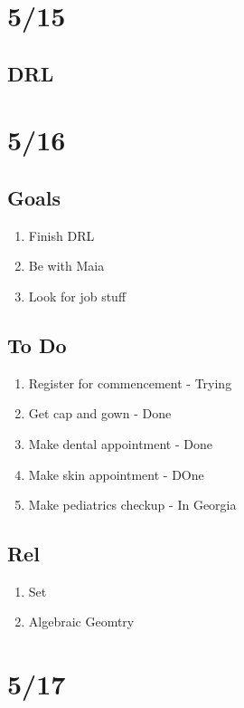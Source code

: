\documentclass[11pt]{article}
\theoremstyle{remark}
\begin{document}
\section{5/15}

\subsection{DRL}

\section{5/16}

\subsection{Goals}

\begin{enumerate}
	\item Finish DRL
	\item Be with Maia
	\item Look for job stuff
\end{enumerate}

\subsection{To Do}

\begin{enumerate}
	\item Register for commencement - Trying
	\item Get cap and gown - Done
	\item Make dental appointment - Done
	\item Make skin appointment - DOne
	\item Make pediatrics checkup - In Georgia
\end{enumerate}

\subsection{Rel}

\begin{enumerate}
	\item Set
	\item Algebraic Geomtry
\end{enumerate}

\section{5/17}
\end{document}
